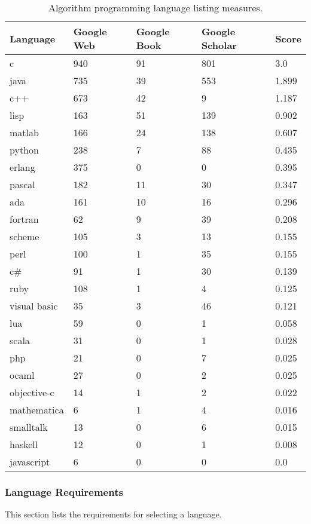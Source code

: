 \documentclass[a4paper, 11pt]{article}
\begin{document}
\begin{table}[htp]
	\centering
		\begin{tabularx}{\textwidth}{lXXXX}
		\toprule
		\textbf{Language} & \textbf{Google Web} & \textbf{Google Book} & \textbf{Google Scholar} & \textbf{Score} \\ 
		\toprule
		c & 940 & 91 & 801 & 3.0 \\
		java & 735 & 39 & 553 & 1.899 \\
		c++ & 673 & 42 & 9 & 1.187 \\
		lisp & 163 & 51 & 139 & 0.902 \\
		matlab & 166 & 24 & 138 & 0.607 \\
		python & 238 & 7 & 88 & 0.435 \\
		erlang & 375 & 0 & 0 & 0.395 \\
		pascal & 182 & 11 & 30 & 0.347 \\
		ada & 161 & 10 & 16 & 0.296 \\
		fortran & 62 & 9 & 39 & 0.208 \\
		scheme & 105 & 3 & 13 & 0.155 \\
		perl & 100 & 1 & 35 & 0.155 \\
		c\# & 91 & 1 & 30 & 0.139 \\
		ruby & 108 & 1 & 4 & 0.125 \\
		visual basic & 35 & 3 & 46 & 0.121 \\
		lua & 59 & 0 & 1 & 0.058 \\
		scala & 31 & 0 & 1 & 0.028 \\
		php & 21 & 0 & 7 & 0.025 \\
		ocaml & 27 & 0 & 2 & 0.025 \\
		objective-c & 14 & 1 & 2 & 0.022 \\
		mathematica & 6 & 1 & 4 & 0.016 \\
		smalltalk & 13 & 0 & 6 & 0.015 \\
		haskell & 12 & 0 & 1 & 0.008 \\
		javascript & 6 & 0 & 0 & 0.0 \\
		\bottomrule
		\end{tabularx}	
	\caption{Algorithm programming language listing measures.}
	\label{tab:results}
\end{table}

% 
% 
\subsubsection{Language Requirements}
\label{subsubsec:requirements}
This section lists the requirements for selecting a language.
\end{document}
